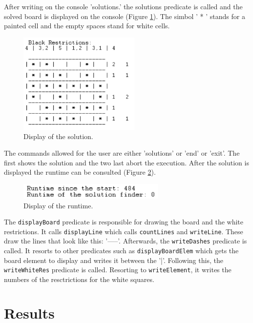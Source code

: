 \documentclass[runningheads,a4paper]{llncs}
\begin{document}
	After writing on the console 'solutions.' the solutions predicate is called and the solved board is displayed on the console (Figure \ref{displayFinal}). The simbol ' * ' stands for a painted cell and the empty spaces stand for white cells.

	\begin{figure}[h]
	\centering
	\includegraphics[height=5cm]{displayFinal.png}
	\caption{Display of the solution.}
	\label{displayFinal}
	\end{figure}

	The commands allowed for the user are either 'solutions' or 'end' or 'exit'. The first shows the solution and the two last abort the execution.
	After the solution is displayed the runtime can be consulted (Figure \ref{runtime}).

	\begin{figure}[h]
	\centering
	\includegraphics[height=0.8cm]{runtime.png}
	\caption{Display of the runtime.}
	\label{runtime}
	\end{figure}

	The \verb|displayBoard| predicate is responsible for drawing the board and the white restrictions. It calls \verb|displayLine| which calls \verb|countLines| and \verb|writeLine|. These draw the lines that look like this: '-----'. Afterwards, the \verb|writeDashes| predicate is called. It resorts to other predicates such as \verb|displayBoardElem| which gets the board element to display and writes it between the '|'. Following this, the \verb|writeWhiteRes| predicate is called. Resorting to \verb|writeElement|, it writes the numbers of the resctrictions for the white squares.

\newpage
\section{Results}
\end{document}
